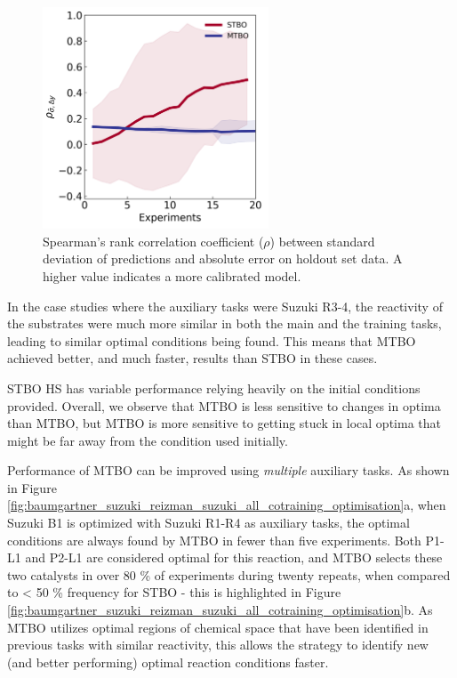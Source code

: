 \begin{figure}
    \centering
    \includegraphics[width=0.6\textwidth]{gfx/Chapter04/baumgartner_suzuki_reizman_suzuki_case_2_optimization_uncertainty.png}
    \caption{Spearman's rank correlation coefficient ($\rho$) between standard deviation of predictions and absolute error on holdout set data. A higher value indicates a more calibrated model.}
    \label{fig:uncertainty_multitask}
\end{figure}


In the case studies where the auxiliary tasks were Suzuki R3-4, the reactivity of the substrates were much more similar in both the main and the training tasks, leading to similar optimal conditions being found. This means that MTBO achieved better, and much faster, results than STBO in these cases. 

STBO HS has variable performance relying heavily on the initial conditions provided. Overall, we observe that MTBO is less sensitive to changes in optima than MTBO, but MTBO is more sensitive to getting stuck in local optima that might be far away from the condition used initially. 

Performance of MTBO can be improved using \textit{multiple} auxiliary tasks. As shown in Figure \ref{fig:baumgartner_suzuki_reizman_suzuki_all_cotraining_optimisation}a, when Suzuki B1 is optimized with Suzuki R1-R4 as auxiliary tasks, the optimal conditions are always found by MTBO in fewer than five experiments. Both P1-L1 and P2-L1 are considered optimal for this reaction, and MTBO selects these two catalysts in over 80 \% of experiments during twenty repeats, when compared to \textless{} 50 \% frequency for STBO - this is highlighted in Figure \ref{fig:baumgartner_suzuki_reizman_suzuki_all_cotraining_optimisation}b. As MTBO utilizes optimal regions of chemical space that have been identified in previous tasks with similar reactivity, this allows the strategy to identify new (and better performing) optimal reaction conditions faster.

